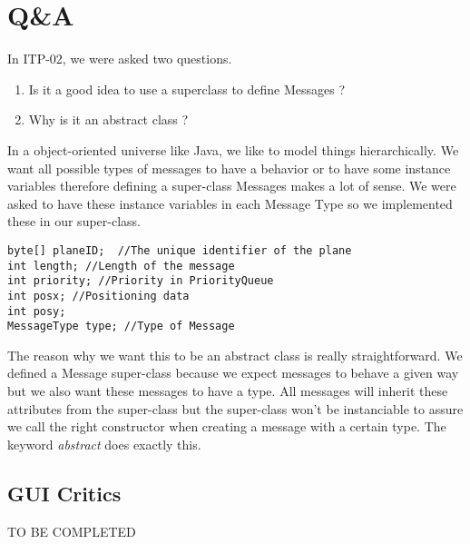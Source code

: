 \documentclass{article}
\begin{document}
\section{Q\&A}

In ITP-02, we were asked two questions. 
\begin{enumerate}
\item Is it a good idea to use a superclass to define Messages ?
\item Why is it an abstract class ?
\end{enumerate}
In a object-oriented universe like Java, we like to model things hierarchically. We want all possible types of messages to have a behavior or to have some instance variables therefore defining a super-class Messages makes a lot of sense. We were asked to have these instance variables in each Message Type so we implemented these in our super-class.

\begin{lstlisting}
byte[] planeID;  //The unique identifier of the plane
int length; //Length of the message
int priority; //Priority in PriorityQueue
int posx; //Positioning data 
int posy;
MessageType type; //Type of Message
\end{lstlisting}

The reason why we want this to be an abstract class is really straightforward. We defined a Message super-class because we expect messages to behave a given way but we also want these messages to have a type. All messages will inherit these attributes from the super-class but the super-class won't be instanciable to assure we call the right constructor when creating a message with a certain type. The keyword \emph{abstract} does exactly this. 

\subsection {GUI Critics}

TO BE COMPLETED
\end{document}
